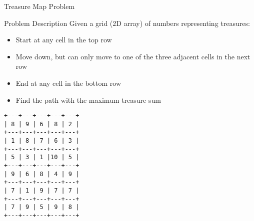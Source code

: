 \documentclass{beamer}
\begin{document}
\begin{frame}{Treasure Map Problem}
    \begin{block}{Problem Description}
        Given a grid (2D array) of numbers representing treasures:
        \begin{itemize}
            \item Start at any cell in the top row
            \item Move down, but can only move to one of the three adjacent cells in the next row
            \item End at any cell in the bottom row
            \item Find the path with the maximum treasure sum
        \end{itemize}
    \end{block}
    
    \begin{lstlisting}[basicstyle=\ttfamily\small]
+---+---+---+---+---+
| 8 | 9 | 6 | 8 | 2 |
+---+---+---+---+---+
| 1 | 8 | 7 | 6 | 3 |
+---+---+---+---+---+
| 5 | 3 | 1 |10 | 5 |
+---+---+---+---+---+
| 9 | 6 | 8 | 4 | 9 |
+---+---+---+---+---+
| 7 | 1 | 9 | 7 | 7 |
+---+---+---+---+---+
| 7 | 9 | 5 | 9 | 8 |
+---+---+---+---+---+
    \end{lstlisting}
\end{frame}
\end{document}
